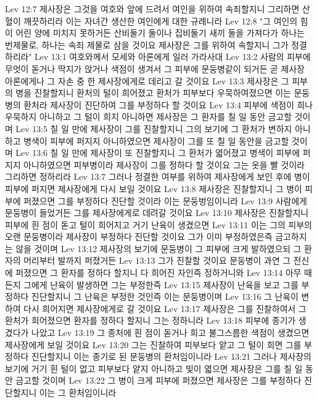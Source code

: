 Lev 12:7  제사장은 그것을 여호와 앞에 드려서 여인을 위하여 속죄할지니 그리하면 산혈이 깨끗하리라 이는 자녀간 생산한 여인에게 대한 규례니라
Lev 12:8  "그 여인의 힘이 어린 양에 미치지 못하거든 산비둘기 둘이나 집비둘기 새끼 둘을 가져다가 하나는 번제물로, 하나는 속죄 제물로 삼을 것이요 제사장은 그를 위하여 속할지니 그가 정결하리라"
Lev 13:1  여호와께서 모세와 아론에게 일러 가라사대
Lev 13:2  사람의 피부에 무엇이 돋거나 딱지가 앉거나 색점이 생겨서 그 피부에 문둥병같이 되거든 곧 제사장 아론에게나 그 자손 중 한 제사장에게로 데리고 갈 것이요
Lev 13:3  제사장은 그 피부의 병을 진찰할지니 환처의 털이 희어졌고 환처가 피부보다 우묵하여졌으면 이는 문둥병의 환처라 제사장이 진단하여 그를 부정하다 할 것이요
Lev 13:4  피부에 색점이 희나 우묵하지 아니하고 그 털이 희지 아니하면 제사장은 그 환자를 칠 일 동안 금고할 것이며
Lev 13:5  칠 일 만에 제사장이 그를 진찰할지니 그의 보기에 그 환처가 변하지 아니하고 병색이 피부에 퍼지지 아니하였으면 제사장이 그를 또 칠 일 동안을 금고할 것이며
Lev 13:6  칠 일 만에 제사장이 또 진찰할지니 그 환처가 엷어졌고 병색이 피부에 퍼지지 아니하였으면 피부병이라 제사장이 그를 정하다 할 것이요 그는 옷을 빨 것이라 그리하면 정하리라
Lev 13:7  그러나 정결한 여부를 위하여 제사장에게 보인 후에 병이 피부에 퍼지면 제사장에게 다시 보일 것이요
Lev 13:8  제사장은 진찰할지니 그 병이 피부에 퍼졌으면 그를 부정하다 진단할 것이라 이는 문둥벙임이니라
Lev 13:9  사람에게 문둥병이 들었거든 그를 제사장에게로 데려갈 것이요
Lev 13:10  제사장은 진찰할지니 피부에 흰 점이 돋고 털이 희어지고 거기 난육이 생겼으면
Lev 13:11  이는 그의 피부의 오랜 문둥병이라 제사장이 부정하다 진단할 것이요 그가 이미 부정하였은즉 금고하지는 않을 것이며
Lev 13:12  제사장의 보기에 문둥병이 그 피부에 크게 발하였으되 그 환자의 머리부터 발까지 퍼졌거든
Lev 13:13  그가 진찰할 것이요 문둥병이 과연 그 전신에 퍼졌으면 그 환자를 정하다 할지니 다 희어진 자인즉 정하거니와
Lev 13:14  아무 때든지 그에게 난육이 발생하면 그는 부정한즉
Lev 13:15  제사장이 난육을 보고 그를 부정하다 진단할지니 그 난육은 부정한 것인즉 이는 문둥병이며
Lev 13:16  그 난육이 변하여 다시 희어지면 제사장에게로 갈 것이요
Lev 13:17  제사장은 그를 진찰하여서 그 환처가 희어졌으면 환자를 정하다 할지니 그는 정하니라
Lev 13:18  피부에 종기가 생겼다가 나았고
Lev 13:19  그 종처에 흰 점이 돋거나 희고 불그스름한 색점이 생겼으면 제사장에게 보일 것이요
Lev 13:20  그는 진찰하여 피부보다 얕고 그 털이 희면 그를 부정하다 진단할지니 이는 종기로 된 문둥병의 환처임이니라
Lev 13:21  그러나 제사장의 보기에 거기 흰 털이 없고 피부보다 얕지 아니하고 빛이 엷으면 제사장은 그를 칠 일 동안 금고할 것이며
Lev 13:22  그 병이 크게 피부에 퍼졌으면 제사장은 그를 부정하다 진단할지니 이는 그 환처임이니라
